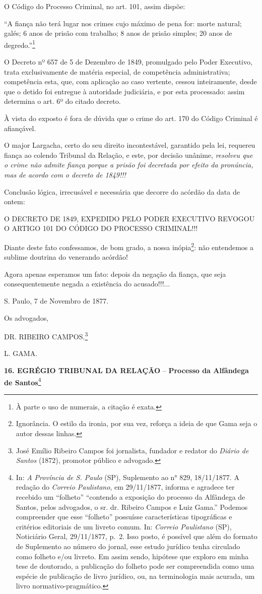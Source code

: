 O Código do Processo Criminal, no art. 101, assim dispõe:

``A fiança não terá lugar nos crimes cujo máximo de pena for: morte
natural; galés; 6 anos de prisão com trabalho; 8 anos de prisão simples;
20 anos de degredo.''\footnote{À parte o uso de numerais, a citação é
  exata.}

O Decreto nº 657 de 5 de Dezembro de 1849, promulgado pelo Poder
Executivo, trata exclusivamente de matéria especial, de competência
administrativa; competência esta, que, com aplicação ao caso vertente,
cessou inteiramente, desde que o detido foi entregue à autoridade
judiciária, e por esta processado: assim determina o art. 6º do citado
decreto.

À vista do exposto é fora de dúvida que o crime do art. 170 do Código
Criminal é afiançável.

O major Largacha, certo do seu direito incontestável, garantido pela
lei, requereu fiança ao colendo Tribunal da Relação, e este, por decisão
unânime, \emph{resolveu que o crime não admite fiança porque a prisão
foi decretada por efeito da pronúncia, mas de acordo com o decreto de
1849!!!}

Conclusão lógica, irrecusável e necessária que decorre do acórdão da
data de ontem:

O DECRETO DE 1849, EXPEDIDO PELO PODER EXECUTIVO REVOGOU O ARTIGO 101 DO
CÓDIGO DO PROCESSO CRIMINAL!!!

Diante deste fato confessamos, de bom grado, a nossa inópia\footnote{Ignorância.
  O estilo da ironia, por sua vez, reforça a ideia de que Gama seja o
  autor dessas linhas.}: não entendemos a sublime doutrina do venerando
acórdão!

Agora apenas esperamos um fato: depois da negação da fiança, que seja
consequentemente negada a existência do acusado!!!...

S. Paulo, 7 de Novembro de 1877.

Os advogados,

DR. RIBEIRO CAMPOS.\footnote{José Emílio Ribeiro Campos foi jornalista,
  fundador e redator do \emph{Diário de Santos} (1872), promotor público
  e advogado.}

L. GAMA.

\textbf{16. EGRÉGIO TRIBUNAL DA RELAÇÃO} -- \textbf{Processo da
Alfândega de Santos}\footnote{In: \emph{A Província de S. Paulo} (SP),
  Suplemento ao n° 829, 18/11/1877. A redação do \emph{Correio
  Paulistano}, em 29/11/1877, informa e agradece ter recebido um
  ``folheto'' ``contendo a exposição do processo da Alfândega de Santos,
  pelos advogados, o sr. dr. Ribeiro Campos e Luiz Gama.'' Podemos
  compreender que esse ``folheto'' possuísse características
  tipográficas e critérios editoriais de um livreto comum. In:
  \emph{Correio Paulistano} (SP), Noticiário Geral, 29/11/1877, p.~2.
  Isso posto, é possível que além do formato de Suplemento ao número do
  jornal, esse estudo jurídico tenha circulado como folheto e/ou
  livreto. Em assim sendo, hipótese que exploro em minha tese de
  doutorado, a publicação do folheto pode ser compreendida como uma
  espécie de publicação de livro jurídico, ou, na terminologia mais
  acurada, um livro normativo-pragmático.}

